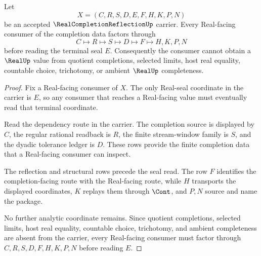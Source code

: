 \begin{theorem}
\label{thm:real-completion-reflection-real-seal-handoff}
Let
$$
X=(C,R,S,D,E,F,H,K,P,N)
$$
be an accepted $\RealCompletionReflectionUp$ carrier. Every Real-facing consumer of the completion data factors through
$$
C \longmapsto R \longmapsto S \longmapsto D \longmapsto F \longmapsto H,K,P,N
$$
before reading the terminal seal $E$. Consequently the consumer cannot obtain a $\RealUp$ value from quotient completions, selected limits, host real equality, countable choice, trichotomy, or ambient $\RealUp$ completeness.
\end{theorem}
\begin{proof}
Fix a Real-facing consumer of $X$. The only Real-seal coordinate in the carrier is $E$, so any consumer that reaches a Real-facing value must eventually read that terminal coordinate.

Read the dependency route in the carrier. The completion source is displayed by $C$, the regular rational readback is $R$, the finite stream-window family is $S$, and the dyadic tolerance ledger is $D$. These rows provide the finite completion data that a Real-facing consumer can inspect.

The reflection and structural rows precede the seal read. The row $F$ identifies the completion-facing route with the Real-facing route, while $H$ transports the displayed coordinates, $K$ replays them through $\Cont$, and $P,N$ source and name the package.

No further analytic coordinate remains. Since quotient completions, selected limits, host real equality, countable choice, trichotomy, and ambient completeness are absent from the carrier, every Real-facing consumer must factor through $C,R,S,D,F,H,K,P,N$ before reading $E$.
\end{proof}


